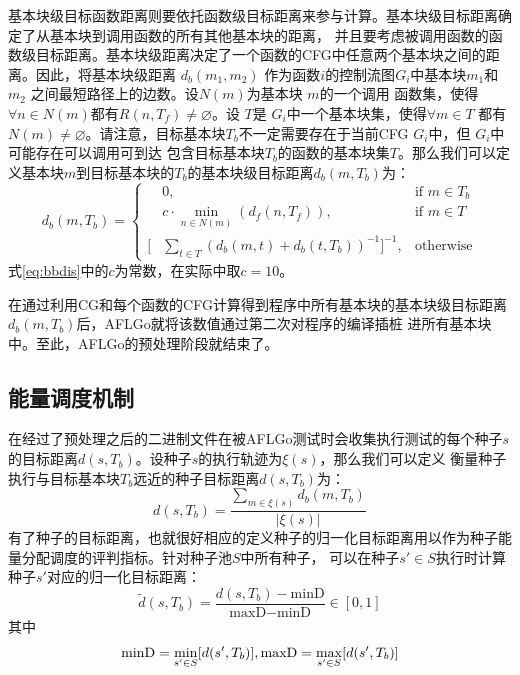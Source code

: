 \documentclass[bachelor]{njupthesis}
\begin{document}
基本块级目标函数距离则要依托函数级目标距离来参与计算。基本块级目标距离确定了从基本块到调用函数的所有其他基本块的距离，
并且要考虑被调用函数的函数级目标距离。基本块级距离决定了一个函数的CFG中任意两个基本块之间的距离。因此，将基本块级距离
$d_b(m_1, m_2)$ 作为函数$i$的控制流图$G_i$中基本块$m_1$和$m_2$ 之间最短路径上的边数。设$N(m)$为基本块 $m$的一个调用
函数集，使得$\forall n \in N (m)$都有$R(n,T_f) \neq \varnothing$。设 $T$是 $G_i$中一个基本块集，使得$\forall m \in T$ 
都有$N(m)\neq \varnothing$。请注意，目标基本块$T_b$不一定需要存在于当前CFG $G_i$中，但 $G_i$中可能存在可以调用可到达
包含目标基本块$T_b$的函数的基本块集$T$。那么我们可以定义基本块$m$到目标基本块的$T_b$的基本块级目标距离$d_b(m,T_b)$为：
\begin{equation}\label{eq:bbdis}
	d_b(m,T_b)=\left\{ \begin{aligned}
		&0 ,&\text{if } m \in T_b \\
		&c \cdot \min \limits_{n\in N(m)}(d_f(n,T_f)) , &\text{if } m \in T \\
	   [&\sum\limits_{t\in T} (d_b(m,t)+d_b(t,T_b))^{-1}]^{-1} , &\text{otherwise} 
   \end{aligned}
   \right.
 \end{equation}
式\ref{eq:bbdis}中的$c$为常数，在实际中取$c=10$。

在通过利用CG和每个函数的CFG计算得到程序中所有基本块的基本块级目标距离$d_b(m,T_b)$后，AFLGo就将该数值通过第二次对程序的编译插桩
进所有基本块中。至此，AFLGo的预处理阶段就结束了。

\subsection{能量调度机制}
在经过了预处理之后的二进制文件在被AFLGo测试时会收集执行测试的每个种子$s$的目标距离$d(s,T_b)$。设种子$s$的执行轨迹为$\xi (s)$，那么我们可以定义
衡量种子执行与目标基本块$T_b$远近的种子目标距离$d(s,T_b)$为：
\begin{equation}\label{eq:sdis}
	d(s,T_b)=\frac{\sum\limits_{m \in \xi (s)}d_b(m,T_b)}{| \xi(s)| }
\end{equation}
有了种子的目标距离，也就很好相应的定义种子的归一化目标距离用以作为种子能量分配调度的评判指标。针对种子池$S$中所有种子，
可以在种子$s'\in S$执行时计算种子$s'$对应的归一化目标距离：
\begin{equation}\label{eq:sndis}
	\widetilde{d}(s,T_b)=\frac{d(s,T_b)-\text{minD}}{\text{maxD}-\text{minD}} \in [0,1]
\end{equation}
其中
\begin{equation}
	\text{minD}=\min\limits_{s'\in S}[d(s',T_b)] ,\\
	\text{maxD}=\max\limits_{s'\in S}[d(s',T_b)] 	
\end{equation}
\end{document}
